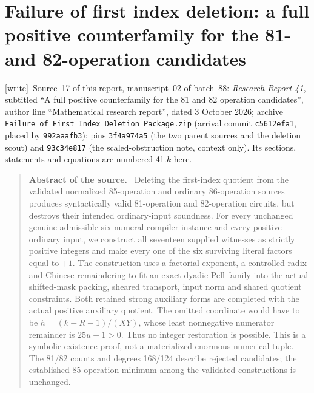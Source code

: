 \documentclass[11pt,letterpaper]{article}
\theoremstyle{definition}\newtheorem{definition}[theorem]{Definition}
\theoremstyle{remark}\newtheorem{remark}[theorem]{Remark}
\newcommand{\wtag}{\textup{[write]}}
\newenvironment{sourceabstract}{\par\begin{quote}\small\textbf{Abstract of the source.}\ }{\end{quote}}
\newcommand{\rw}[1]{\nolinkurl{#1}}%
\begin{document}
\part{Failure of first index deletion: a full positive counterfamily for the 81- and 82-operation candidates}\label{fup:part:fd}
\noindent\wtag\ Source~17 of this report, manuscript~02 of batch~88: \emph{Research Report 41}, subtitled ``A full positive counterfamily for the 81 and 82 operation candidates'', author line ``Mathematical research report'', dated 3 October 2026; archive \rw{Failure_of_First_Index_Deletion_Package.zip} (arrival commit \texttt{c5612efa1}, placed by \texttt{992aaafb3}); pins \texttt{3f4a974a5} (the two parent sources and the deletion scout) and \texttt{93c34e817} (the scaled-obstruction note, context only). Its sections, statements and equations are numbered 41.$k$ here.
\begin{sourceabstract}
Deleting the first-index quotient from the validated normalized 85-operation and ordinary 86-operation sources produces syntactically valid 81-operation and 82-operation circuits, but destroys their intended ordinary-input soundness. For every unchanged genuine admissible six-numeral compiler instance and every positive ordinary input, we construct all seventeen supplied witnesses as strictly positive integers and make every one of the six surviving literal factors equal to $+1$. The construction uses a factorial exponent, a controlled radix and Chinese remaindering to fit an exact dyadic Pell family into the actual shifted-mask packing, sheared transport, input norm and shared quotient constraints. Both retained strong auxiliary forms are completed with the actual positive auxiliary quotient. The omitted coordinate would have to be $h=(k-R-1)/(XY)$, whose least nonnegative numerator remainder is $25u-1>0$. Thus no integer restoration is possible. This is a symbolic existence proof, not a materialized enormous numerical tuple. The 81/82 counts and degrees 168/124 describe rejected candidates; the established 85-operation minimum among the validated constructions is unchanged.
\end{sourceabstract}
\end{document}
